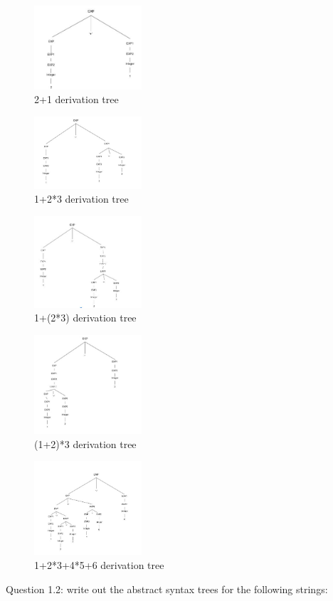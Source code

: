 \documentclass{article}
\theoremstyle{theorem}
\theoremstyle{definition}
\theoremstyle{remark}
\begin{document}
 \begin{figure}[htp]
    \centering
    \includegraphics[width=4cm]{1}
    \caption{ 2+1  derivation tree}
    \label{fig: 2+1}
\end{figure}
 \begin{figure}[htp]
    \centering
    \includegraphics[width=4cm]{2}
    \caption{1+2*3  derivation tree}
    \label{fig:1+2*3}
\end{figure}
 \begin{figure}[htp]
    \centering
    \includegraphics[width=4cm]{3}
    \caption{1+(2*3) derivation tree}
    \label{fig:1+(2*3)}
\end{figure}
 \begin{figure}[htp]
    \centering
    \includegraphics[width=4cm]{4}
    \caption{(1+2)*3 derivation tree}
    \label{fig:(1+2)*3}
\end{figure}
 \begin{figure}[htp]
    \centering
    \includegraphics[width=4cm]{5th}
    \caption{1+2*3+4*5+6  derivation tree}
    \label{fig:1+2*3+4*5+6}
\end{figure}
Question 1.2:
    write out the abstract syntax trees for the following strings:
\end{document}
